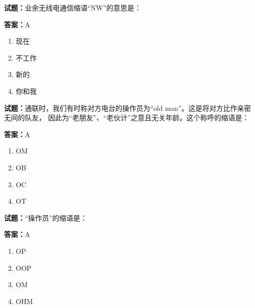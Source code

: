 \documentclass{ctexbook}
\begin{document}




\vspace{1em}

\textbf{试题：}业余无线电通信缩语“NW”的意思是： 

\textbf{答案：}A 

\begin{enumerate}[leftmargin=3em]
  \item 现在 

  \item 不工作 

  \item 新的 

  \item 你和我 

\end{enumerate}





\vspace{1em}

\textbf{试题：}通联时，我们有时称对方电台的操作员为“old man”。这是将对方比作亲密无间的队友，
因此为“老朋友”、“老伙计”之意且无关年龄。这个称呼的缩语是： 

\textbf{答案：}A 

\begin{enumerate}[leftmargin=3em]
  \item OM 

  \item OB 

  \item OC 

  \item OT 

\end{enumerate}





\vspace{1em}

\textbf{试题：}“操作员”的缩语是： 

\textbf{答案：}A 

\begin{enumerate}[leftmargin=3em]
  \item OP 

  \item OOP 

  \item OM 

  \item OHM 

\end{enumerate}
\end{document}

